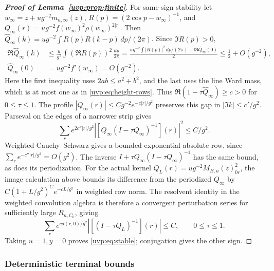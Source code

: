 \documentclass[11pt]{article}
\numberwithin{equation}{section}
\theoremstyle{remark}
\begin{document}
\begin{proof}[\textbf{Proof of Lemma~\ref{uvp:prop:finite}}]
For same-sign stability let $w_\infty=z+ug^{-2}m_{u,\infty}(z)$,
$R(p)=(2\cos p-w_\infty)^{-1}$, and
$Q_\infty(r)=ug^{-2}f(w_\infty)^2\rho(w_\infty)^{2|r|}$. Then
$\widehat Q_\infty(k)=ug^{-2}\int R(p)R(k-p)\,dp/(2\pi)$.
Since $\Im R(p)>0$,
\[
 \begin{aligned}
 \Re\widehat Q_\infty(k)
 &\le\frac{u}{g^2}\int(\Re R(p))^2\,\frac{dp}{2\pi}
 =\frac{ug^{-2}\int|R(p)|^2\,dp/(2\pi)+\Re\widehat Q_\infty(0)}2
 \le\tfrac12+O(g^{-2}),\\
 \widehat Q_\infty(0)&=ug^{-2}f'(w_\infty)=O(g^{-2}).
 \end{aligned}
\]
Here the first inequality uses $2ab\le a^2+b^2$, and the last uses
the line Ward mass, which is at most one as in \eqref{uvp:eq:height-rows}.
Thus $\Re(1-\tau\widehat Q_\infty)\ge c>0$ for $0\le\tau\le1$.
The profile $|Q_\infty(r)|\le Cg^{-2}e^{-c|r|/g^2}$ preserves this
gap in $|\Im k|\le c'/g^2$. Parseval on the edges of a narrower strip gives
\[
 \sum_r e^{2c''|r|/g^2}
 |[Q_\infty(I-\tau Q_\infty)^{-1}](r)|^2\le C/g^2.
\]
Weighted Cauchy--Schwarz gives a bounded exponential absolute row,
since $\sum_r e^{-c''|r|/g^2}=O(g^2)$.
The inverse $I+\tau Q_\infty(I-\tau Q_\infty)^{-1}$ has the same bound,
as does its periodization. For the actual kernel
$Q_L(r)=ug^{-2}M_{B,u}(z)_{0r}^2$, the image calculation above bounds
its difference from the periodized $Q_\infty$ by
$C(1+L/g^2)^Ce^{-cL/g^2}$ in weighted row norm.
The resolvent identity in the weighted convolution algebra is therefore
a convergent perturbation series for sufficiently large $R_{\kappa,C_0}$, giving
\begin{equation}\label{uvp:eq:height-stability}
 \sum_r e^{cd(r,0)/g^2}|[(I-\tau Q_L)^{-1}](r)|\le C,
 \qquad 0\le\tau\le1.
\end{equation}
Taking $u=1,y=0$ proves \eqref{uvp:eq:stable}; conjugation gives the other sign.
\end{proof}

\subsubsection{Deterministic terminal bounds}
\label{app:terminal-deterministic-large}
\end{document}
